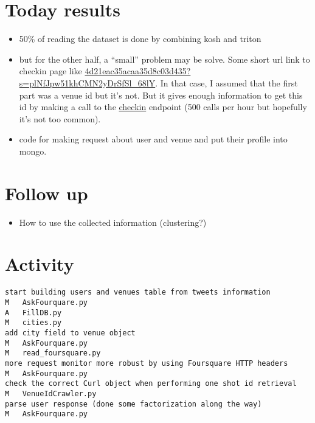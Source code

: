 \section*{Today results}
\begin{itemize}
	\item 50\% of reading the dataset is done by combining kosh and triton
	\item but for the other half, a ``small'' problem may be solve. Some short
		url link to checkin page like
		\href{https://fr.foursquare.com/tommiar/checkin/4d21eac35acaa35d8c03d435?s=plNfJpw51khCMN2yDrSfSl\_68lY}{4d21eac35acaa35d8c03d435?s=plNfJpw51khCMN2yDrSfSl\_68lY}.
		In that case, I assumed that the first part was a venue id but it's
		not. But it gives enough information to get this id by making a call
		to the
		\href{https://developer.foursquare.com/docs/checkins/checkins}{checkin}
		endpoint (500 calls per hour but hopefully it's not too common).
	\item code for making request about user and venue and put their profile
		into mongo.
\end{itemize}

\section*{Follow up}
\begin{itemize}
	\item How to use the collected information (clustering?)
\end{itemize}

\section*{Activity}
\begin{verbatim}
start building users and venues table from tweets information
M	AskFourquare.py
A	FillDB.py
M	cities.py
add city field to venue object
M	AskFourquare.py
M	read_foursquare.py
more request monitor more robust by using Foursquare HTTP headers
M	AskFourquare.py
check the correct Curl object when performing one shot id retrieval
M	VenueIdCrawler.py
parse user response (done some factorization along the way)
M	AskFourquare.py
\end{verbatim}
